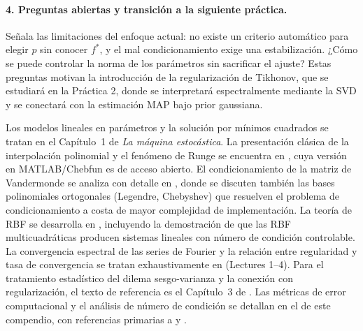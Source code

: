 \paragraph*{4. Preguntas abiertas y transición a la siguiente práctica.}
Señala las limitaciones del enfoque actual: no existe un criterio automático para elegir \(p\) sin conocer \(f^*\), y el mal condicionamiento exige una estabilización. ¿Cómo se puede controlar la norma de los parámetros sin sacrificar el ajuste? Estas preguntas motivan la introducción de la regularización de Tikhonov, que se estudiará en la Práctica 2, donde se interpretará espectralmente mediante la SVD y se conectará con la estimación MAP bajo prior gaussiana.

\begin{notasbib}
Los modelos lineales en parámetros y la solución por mínimos cuadrados se
tratan en el Capítulo~1 de \textit{La máquina estocástica}. La presentación
clásica de la interpolación polinomial y el fenómeno de Runge se encuentra
en \textcite{trefethen2019approximation}, cuya versión en MATLAB/Chebfun es
de acceso abierto. El condicionamiento de la matriz de Vandermonde se
analiza con detalle en \textcite{gautschi2012numerical}, donde se discuten
también las bases polinomiales ortogonales (Legendre, Chebyshev) que
resuelven el problema de condicionamiento a costa de mayor complejidad
de implementación. La teoría de RBF se desarrolla en \textcite{wendland2004scattered},
incluyendo la demostración de que las RBF multicuadráticas producen
sistemas lineales con número de condición controlable. La convergencia
espectral de las series de Fourier y la relación entre regularidad y tasa de
convergencia se tratan exhaustivamente en \textcite{trefethen1997numerical}
(Lectures 1--4). Para el tratamiento estadístico del dilema sesgo-varianza
y la conexión con regularización, el texto de referencia es el Capítulo~3
de \textcite{bishop2006pattern}. Las métricas de error computacional y el
análisis de número de condición se detallan en el 
de este compendio, con referencias primarias a \textcite{golub2013matrix}
y \textcite{higham2002accuracy}.
\end{notasbib}

\printbibliography[heading=subbibliography,title={Referencias}]